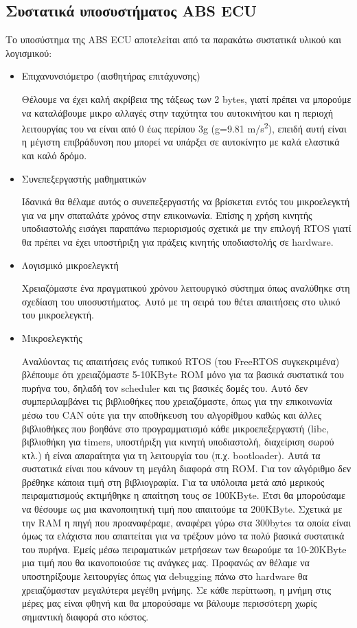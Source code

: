 \documentclass{article}
\begin{document}
\subsection{Συστατικά υποσυστήματος ABS ECU}
Το υποσύστημα της ABS ECU αποτελείται από τα παρακάτω συστατικά υλικού και λογισμικού:
\begin{itemize}
    \item Επιχανυνσιόμετρο (αισθητήρας επιτάχυνσης)
    \par
     Θέλουμε να έχει καλή ακρίβεια της τάξεως των 2 bytes, γιατί πρέπει να μπορούμε να καταλάβουμε μικρο αλλαγές στην ταχύτητα του αυτοκινήτου και η περιοχή λειτουργίας του να είναι από 0 έως περίπου 3g (g=9.81 m/s\textsuperscript{2}), επειδή αυτή είναι η μέγιστη επιβράδυνση που μπορεί να υπάρξει σε αυτοκίνητο με καλά ελαστικά και καλό δρόμο.
    \item Συνεπεξεργαστής μαθηματικών
    \par
    Ιδανικά θα θέλαμε αυτός ο συνεπεξεργαστής να βρίσκεται εντός του μικροελεγκτή για να μην σπαταλάτε χρόνος στην επικοινωνία. Επίσης η χρήση κινητής υποδιαστολής εισάγει παραπάνω περιορισμούς σχετικά με την επιλογή RTOS γιατί θα πρέπει να έχει υποστήριξη για πράξεις κινητής υποδιαστολής σε hardware.
    \item Λογισμικό μικροελεγκτή
    \par
    Χρειαζόμαστε ένα πραγματικού χρόνου λειτουργικό σύστημα όπως αναλύθηκε στη σχεδίαση του υποσυστήματος. Αυτό με τη σειρά του θέτει απαιτήσεις στο υλικό του μικροελεγκτή.
    \item Μικροελεγκτής
    \par
    Αναλύοντας τις απαιτήσεις ενός τυπικού RTOS\cite{freertos:20} (του FreeRTOS συγκεκριμένα) βλέπουμε ότι χρειαζόμαστε 5-10KByte ROM μόνο για τα βασικά συστατικά του πυρήνα του, δηλαδή τον scheduler και τις βασικές δομές του. Αυτό δεν συμπεριλαμβάνει τις βιβλιοθήκες που χρειαζόμαστε, όπως για την επικοινωνία μέσω του CAN ούτε για την αποθήκευση του αλγορίθμου καθώς και άλλες βιβλιοθήκες που βοηθάνε στο προγραμματισμό κάθε μικροεπεξεργαστή (libc, βιβλιοθήκη για timers, υποστήριξη για κινητή υποδιαστολή, διαχείριση σωρού κτλ.) ή είναι απαραίτητα για τη λειτουργία του (π.χ. bootloader). Αυτά τα συστατικά είναι που κάνουν τη μεγάλη διαφορά στη ROM. Για τον αλγόριθμο δεν βρέθηκε κάποια τιμή στη βιβλιογραφία. Για τα υπόλοιπα μετά από μερικούς πειραματισμούς εκτιμήθηκε η απαίτηση τους σε 100KByte. Έτσι θα μπορούσαμε να θέσουμε ως μια ικανοποιητική τιμή που απαιτούμε τα 200KByte. Σχετικά με την RAM η πηγή που προαναφέραμε, αναφέρει γύρω στα 300bytes τα οποία είναι όμως τα ελάχιστα που απαιτείται για να τρέξουν μόνο τα πολύ βασικά συστατικά του πυρήνα. Εμείς μέσω πειραματικών μετρήσεων των θεωρούμε τα 10-20KByte μια τιμή που θα ικανοποιούσε τις ανάγκες μας. Προφανώς αν θέλαμε να υποστηρίξουμε λειτουργίες όπως για debugging πάνω στο hardware θα χρειαζόμασταν μεγαλύτερα μεγέθη μνήμης. Σε κάθε περίπτωση, η μνήμη στις μέρες μας είναι φθηνή και θα μπορούσαμε να βάλουμε περισσότερη χωρίς σημαντική διαφορά στο κόστος.
\end{itemize}
\end{document}

